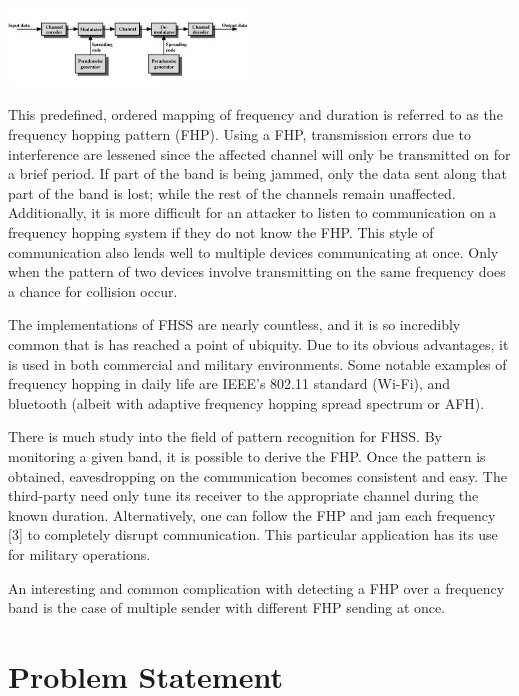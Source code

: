 \documentclass[conference]{IEEEtran}
\begin{document}
\begin{center}
\includegraphics[width=2.5in]{fhss.png}
\end{center}

This predefined, ordered mapping of frequency and duration is referred to as the frequency hopping pattern (FHP).
Using a FHP, transmission errors due to interference are lessened since the affected channel will only be transmitted on for a brief period.
If part of the band is being jammed, only the data sent along that part of the band is lost; while the rest of the channels remain unaffected.
Additionally, it is more difficult for an attacker to listen to communication on a frequency hopping system if they do not know the FHP.
This style of communication also lends well to multiple devices communicating at once.
Only when the pattern of two devices involve transmitting on the same frequency does a chance for collision occur.

The implementations of FHSS are nearly countless, and it is so incredibly common that is has reached a point of ubiquity.
Due to its obvious advantages, it is used in both commercial and military environments.
Some notable examples of frequency hopping in daily life are IEEE's 802.11 standard (Wi-Fi), and bluetooth (albeit with adaptive frequency hopping spread spectrum or AFH).

There is much study into the field of pattern recognition for FHSS.
By monitoring a given band, it is possible to derive the FHP.
Once the pattern is obtained, eavesdropping on the communication becomes consistent and easy.
The third-party need only tune its receiver to the appropriate channel during the known duration.
Alternatively, one can follow the FHP and jam each frequency [3] to completely disrupt communication.
This particular application has its use for military operations.

An interesting and common complication with detecting a FHP over a frequency band is the case of multiple sender with different FHP sending at once.

\section{Problem Statement}
\end{document}

